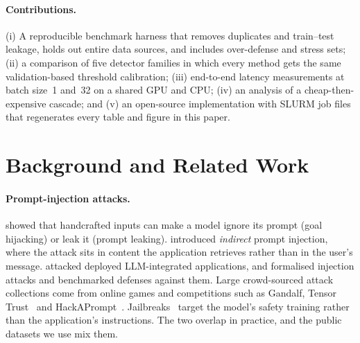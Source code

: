 \documentclass[11pt]{article}
\begin{document}
\paragraph{Contributions.}
(i) A reproducible benchmark harness that removes duplicates and train--test leakage,
holds out entire data sources, and includes over-defense and stress sets;
(ii) a comparison of five detector families in which every method gets the same
validation-based threshold calibration;
(iii) end-to-end latency measurements at batch size~1 and~32 on a shared GPU and CPU;
(iv) an analysis of a cheap-then-expensive cascade; and
(v) an open-source implementation with SLURM job files that regenerates every table and
figure in this paper.

\section{Background and Related Work}
\label{sec:related}

\paragraph{Prompt-injection attacks.}
\citet{perez2022ignore} showed that handcrafted inputs can make a model ignore its prompt
(goal hijacking) or leak it (prompt leaking). \citet{greshake2023not} introduced
\emph{indirect} prompt injection, where the attack sits in content the application
retrieves rather than in the user's message. \citet{liu2023houyi} attacked deployed
LLM-integrated applications, and \citet{liu2024formalizing} formalised injection attacks
and benchmarked defenses against them. Large crowd-sourced attack collections come
from online games and competitions such as Gandalf, Tensor Trust~\citep{toyer2023tensor}
and HackAPrompt~\citep{schulhoff2023hackaprompt}. Jailbreaks~\citep{wei2023jailbroken}
target the model's safety training rather than the application's instructions. The two
overlap in practice, and the public datasets we use mix them.
\end{document}
